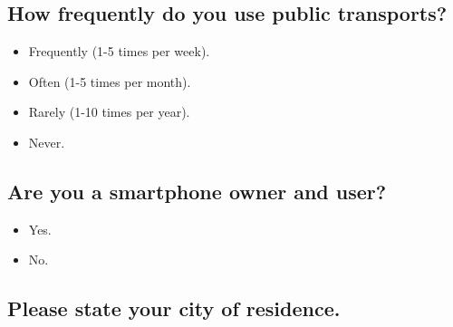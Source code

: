 \subsection{How frequently do you use public transports?}
\begin{itemize}
\item Frequently (1-5 times per week).
\item Often (1-5 times per month).
\item Rarely (1-10 times per year).
\item Never.
\end{itemize}

\subsection{Are you a smartphone owner and user?}
\begin{itemize}
\item Yes.
\item No.
\end{itemize}

\subsection{Please state your city of residence.}

